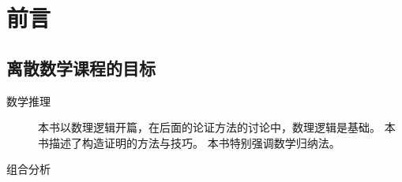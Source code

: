 \chapter{前言}
{
    \section{离散数学课程的目标}
    {
        \begin{description}
            \item[数学推理]
            {
                本书以数理逻辑开篇，在后面的论证方法的讨论中，数理逻辑是基础。
                本书描述了构造证明的方法与技巧。
                本书特别强调数学归纳法。
            }
            \item[组合分析]
            {

            }
        \end{description}
    }
}


\cleardoublepage

\endinput
